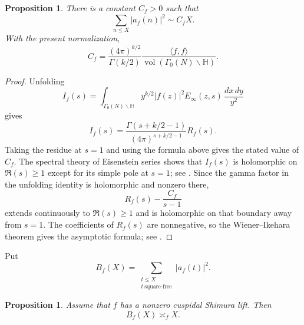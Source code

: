 \documentclass[10pt,a4paper]{amsart}
\newtheorem{proposition}[theorem]{Proposition}
\newcommand{\Hh}{\mathbb H}
\newcommand{\vol}{\operatorname{vol}}
\begin{document}
\begin{proposition}\label{prop:all-second}
There is a constant $C_f>0$ such that
\[
\sum_{n\le X}|a_f(n)|^2\sim C_fX.
\]
With the present normalization,
\[
C_f=\frac{(4\pi)^{k/2}}{\Gamma(k/2)}
\frac{\langle f,f\rangle}{\vol(\Gamma_0(N)\backslash\Hh)}.
\]
\end{proposition}

\begin{proof}
Unfolding
\[
I_f(s)=\int_{\Gamma_0(N)\backslash\Hh}
y^{k/2}|f(z)|^2E_\infty(z,s)\,\frac{dx\,dy}{y^2}
\]
gives
\[
I_f(s)=\frac{\Gamma(s+k/2-1)}{(4\pi)^{s+k/2-1}}R_f(s).
\]
Taking the residue at $s=1$ and using the formula above gives the stated
value of $C_f$. The spectral theory of Eisenstein series shows that
$I_f(s)$ is holomorphic on $\Re(s)\geq1$ except for its simple pole at
$s=1$; see \cite[Chapter~6]{IwaniecSpectral}. Since the gamma factor in
the unfolding identity is holomorphic and nonzero there,
\[
R_f(s)-\frac{C_f}{s-1}
\]
extends continuously to $\Re(s)\geq1$ and is holomorphic on that boundary
away from $s=1$. The coefficients of $R_f(s)$ are nonnegative, so the
Wiener--Ikehara theorem gives the asymptotic formula; see
\cite[Chapter~II.7]{Tenenbaum}.
\end{proof}

Put
\[
B_f(X)=\sum_{\substack{t\le X\\t\ \mathrm{square\text{-}free}}}|a_f(t)|^2.
\]

\begin{proposition}\label{prop:squarefree-second}
Assume that $f$ has a nonzero cuspidal Shimura lift. Then
\[
B_f(X)\asymp_f X.
\]
\end{proposition}
\end{document}
